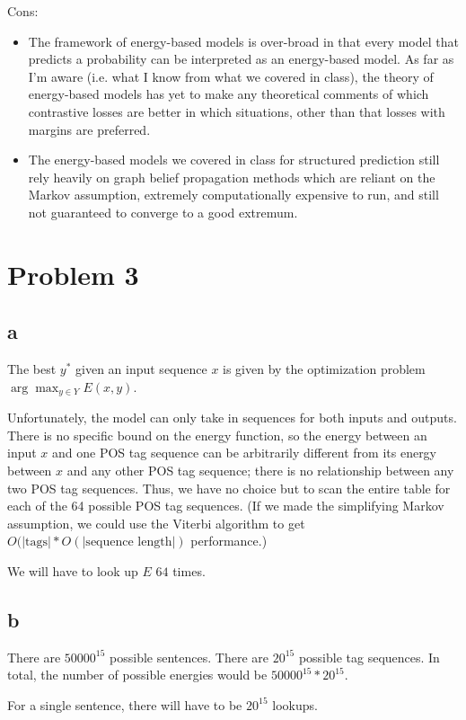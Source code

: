 \documentclass{article}
\begin{document}
Cons:
\begin{itemize}
    \item The framework of energy-based models is over-broad in that every model that predicts a probability can be interpreted as an energy-based model. As far as I'm aware (i.e. what I know from what we covered in class), the theory of energy-based models has yet to make any theoretical comments of which contrastive losses are better in which situations, other than that losses with margins are preferred.
    \item The energy-based models we covered in class for structured prediction still rely heavily on graph belief propagation methods which are reliant on the Markov assumption,  extremely computationally expensive to run, and still not guaranteed to converge to a good extremum.
\end{itemize}

\section{Problem 3}
\subsection{a}
The best $y^*$ given an input sequence $x$ is given by the optimization problem $\arg\max_{y \in Y} E(x,y)$.

Unfortunately, the model can only take in sequences for both inputs and outputs. There is no specific bound on the energy function, so the energy between an input $x$ and one POS tag sequence can be arbitrarily different from its energy between $x$ and any other POS tag sequence; there is no relationship between any two POS tag sequences. Thus, we have no choice but to scan the entire table for each of the 64 possible POS tag sequences. (If we made the simplifying Markov assumption, we could use the Viterbi algorithm to get $O(|\text{tags}| * O(|\text{sequence length}|)$ performance.)

We will have to look up $E$ $64$ times.

\subsection{b}
There are $50000^{15}$ possible sentences. There are $20^{15}$ possible tag sequences. In total, the number of possible energies would be $50000^{15} * 20^{15}$.

For a single sentence, there will have to be $20^{15}$ lookups.
\end{document}
